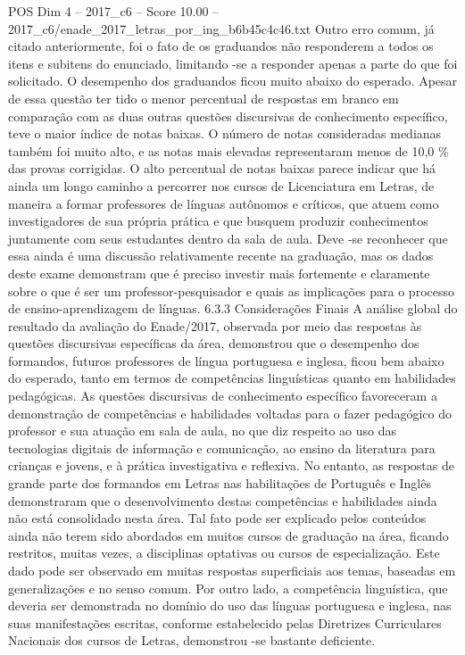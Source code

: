 \begin{textsample}{POS Dim 4 – 2017\_c6 – Score 10.00 – 2017\_c6/enade\_2017\_letras\_por\_ing\_b6b45c4c46.txt}
Outro erro comum, já citado anteriormente, foi o fato de os graduandos não responderem a todos os itens e subitens do enunciado, limitando -se a responder apenas a parte do que foi solicitado.
O desempenho dos graduandos ficou muito abaixo do esperado.
Apesar de essa questão ter tido o menor percentual de respostas em branco em comparação com as duas outras questões discursivas de conhecimento específico, teve o maior índice de notas baixas.
O número de notas consideradas medianas também foi muito alto, e as notas mais elevadas representaram menos de 10,0 \% das provas corrigidas.
O alto percentual de notas baixas parece indicar que há ainda um longo caminho a percorrer nos cursos de Licenciatura em Letras, de maneira a formar professores de línguas autônomos e críticos, que atuem como investigadores de sua própria prática e que busquem produzir conhecimentos juntamente com seus estudantes dentro da sala de aula.
Deve -se reconhecer que essa ainda é uma discussão relativamente recente na graduação, mas os dados deste exame demonstram que é preciso investir mais fortemente e claramente sobre o que é ser um professor-pesquisador e quais as implicações para o processo de ensino-aprendizagem de línguas. 6.3.3 Considerações Finais A análise global do resultado da avaliação do Enade/2017, observada por meio das respostas às questões discursivas específicas da área, demonstrou que o desempenho dos formandos, futuros professores de língua portuguesa e inglesa, ficou bem abaixo do esperado, tanto em termos de competências linguísticas quanto em habilidades pedagógicas.
As questões discursivas de conhecimento específico favoreceram a demonstração de competências e habilidades voltadas para o fazer pedagógico do professor e sua atuação em sala de aula, no que diz respeito ao uso das tecnologias digitais de informação e comunicação, ao ensino da literatura para crianças e jovens, e à prática investigativa e reflexiva.
No entanto, as respostas de grande parte dos formandos em Letras nas habilitações de Português e Inglês demonstraram que o desenvolvimento destas competências e habilidades ainda não está consolidado nesta área.
Tal fato pode ser explicado pelos conteúdos ainda não terem sido abordados em muitos cursos de graduação na área, ficando restritos, muitas vezes, a disciplinas optativas ou cursos de especialização.
Este dado pode ser observado em muitas respostas superficiais aos temas, baseadas em generalizações e no senso comum.
Por outro lado, a competência linguística, que deveria ser demonstrada no domínio do uso das línguas portuguesa e inglesa, nas suas manifestações escritas, conforme estabelecido pelas Diretrizes Curriculares Nacionais dos cursos de Letras, demonstrou -se bastante deficiente.

\end{textsample}

